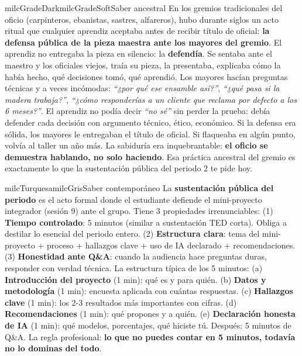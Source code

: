 \documentclass[11pt,letterpaper]{article}
\begin{document}
\begin{softbox}{milcGradeDark}{milcGradeSoft}{Saber ancestral}
En los gremios tradicionales del oficio (carpinteros, ebanistas, sastres, alfareros), hubo durante siglos un acto ritual que cualquier aprendiz aceptaba antes de recibir título de oficial: \textbf{la defensa pública de la pieza maestra ante los mayores del gremio}. El aprendiz no entregaba la pieza en silencio: la \textbf{defendía}. Se sentaba ante el maestro y los oficiales viejos, traía su pieza, la presentaba, explicaba cómo la había hecho, qué decisiones tomó, qué aprendió. Los mayores hacían preguntas técnicas y a veces incómodas: \emph{``¿por qué ese ensamble así?''}, \emph{``¿qué pasa si la madera trabaja?''}, \emph{``¿cómo responderías a un cliente que reclama por defecto a los 6 meses?''}. El aprendiz no podía decir \emph{``no sé''} sin perder la prueba: debía defender cada decisión con argumento técnico, ético, económico. Si la defensa era sólida, los mayores le entregaban el título de oficial. Si flaqueaba en algún punto, volvía al taller un año más. La sabiduría era inquebrantable: \textbf{el oficio se demuestra hablando, no solo haciendo}. Esa práctica ancestral del gremio es exactamente lo que la sustentación pública del periodo 2 te pide hoy.
\end{softbox}

\begin{softbox}{milcTurquesa}{milcGris}{Saber contemporáneo}
La \textbf{sustentación pública del periodo} es el acto formal donde el estudiante defiende el mini-proyecto integrador (sesión 9) ante el grupo. Tiene 3 propiedades irrenunciables: (1) \textbf{Tiempo controlado}: 5 minutos (similar a sustentación TED corta). Obliga a destilar lo esencial del periodo entero. (2) \textbf{Estructura clara}: tema del mini-proyecto + proceso + hallazgos clave + uso de IA declarado + recomendaciones. (3) \textbf{Honestidad ante Q\&A}: cuando la audiencia hace preguntas duras, responder con verdad técnica. La estructura típica de los 5 minutos: (a) \textbf{Introducción del proyecto} (1 min): qué es y para quién. (b) \textbf{Datos y metodología} (1 min): encuesta aplicada con cuántas respuestas. (c) \textbf{Hallazgos clave} (1 min): los 2-3 resultados más importantes con cifras. (d) \textbf{Recomendaciones} (1 min): qué propones y a quién. (e) \textbf{Declaración honesta de IA} (1 min): qué modelos, porcentajes, qué hiciste tú. Después: 5 minutos de Q\&A. La regla profesional: \textbf{lo que no puedes contar en 5 minutos, todavía no lo dominas del todo}.
\end{softbox}
\end{document}
